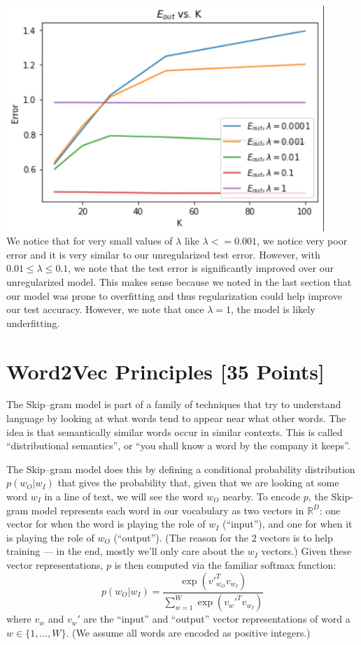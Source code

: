 \begin{solution}
\\ \includegraphics[width=12cm]{plots/Problem_2E.png} \\
We notice that for very small values of $\lambda$ like $\lambda <= 0.001$, we notice very poor error and it is very similar to our unregularized test error. However, with $ 0.01 \leq \lambda \leq 0.1$, we note that the test error is significantly improved over our unregularized model. This makes sense because we noted in the last section that our model was prone to overfitting and thus regularization could help improve our test accuracy. However, we note that once $\lambda = 1$, the model is likely underfitting. 
\end{solution}



\newpage
\section{Word2Vec Principles [35 Points]}

The Skip--gram model is part of a family of techniques that try to understand language by looking at what words tend to appear near what other words.  The idea is that semantically similar words occur in similar contexts.  This is called ``distributional semantics'', or ``you shall know a word by the company it keeps''.  

The Skip--gram model does this by defining a conditional probability distribution $p(w_O|w_I)$ that gives the probability that, given that we are looking at some word $w_I$ in a line of text, we will see the word $w_O$ nearby.  To encode $p$, the Skip-gram model represents each word in our vocabulary as two vectors in $\mathbb{R}^D$: one vector for when the word is playing the role of $w_I$ (``input''), and one for when it is playing the role of $w_O$ (``output'').  (The reason for the 2 vectors is to help training --- in the end, mostly we'll only care about the $w_I$ vectors.)  Given these vector representations, $p$ is then computed via the familiar softmax function:
\[ p(w_O|w_I) = \frac{\exp \left({v'}_{w_O}^T v_{w_I} \right)}{\sum_{w=1}^W \exp \left( {v_w'}^T v_{w_I} \right)} \tag{2} \label{eqn:softmax} \]
where $v_w$ and $v_w'$ are the ``input'' and ``output'' vector representations of word a $w \in \{1, ..., W\}$.  (We assume all words are encoded as positive integers.)

